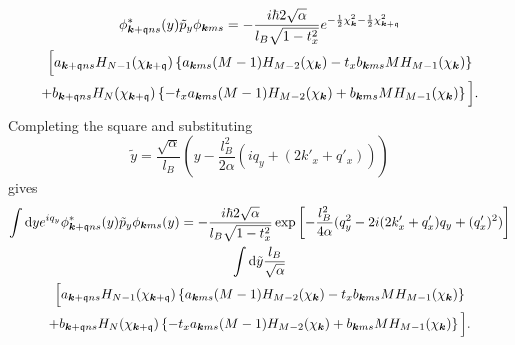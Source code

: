 \begin{multline}
  \phi ^{*} _{\bm{k} + \mathfrak{q} ns} (y) \tilde{p}_{y} \phi _{\bm{k} m s}
  = -\frac{i\hbar 2 \sqrt{\alpha } }{l_{B} \sqrt{1 - t_{x}^2} }
  e^{-\frac{1}{2} \chi _{\bm{k}}^2 - \frac{1}{2} \chi _{\bm{k} + \mathfrak{q}} ^2}\\
  \Big[
  a_{\bm{k} + \mathfrak{q} ns} H_{N-1}(\chi_{\bm{k}+\mathfrak{q}})
  \left\{a_{\bm{k} ms} (M-1) H_{M-2} (\chi_{\bm{k}}) - t_{x} b_{\bm{k} ms} M H_{M-1} (\chi_{\bm{k}})\right\}\\
  +
  b_{\bm{k} + \mathfrak{q} ns} H_{N} (\chi_{\bm{k} + \mathfrak{q}})
  \left\{-t_{x} a_{\bm{k} ms} (M-1) H_{M-2} (\chi_{\bm{k}}) + b_{\bm{k} ms} M H_{M-1} (\chi_{\bm{k}})\right\}
  \Big].
\end{multline}
Completing the square and substituting
\[
  \tilde{y} = \frac{\sqrt{ \alpha  }}{l_{B}}
  \left(y - \frac{l_{B}^2}{2 \alpha } (i q_{y} + (2 k'_x + q' _x) ) \right)
\]
gives
\begin{multline}
  \int \mathrm{d}y
  e^{i q_{y}}
  \phi ^{*}_{\bm{k} + \mathfrak{q} ns}(y) \tilde{p}_{y}
  \phi_{\bm{k} ms} (y)
  =
  - \frac{i\hbar 2 \sqrt{\alpha} }{l_{B} \sqrt{1 - t_{x}^2} }
  \exp
  \left[
    - \frac{l_{B}^2}{4 \alpha } (q_{y}^2 - 2 i (2k' _x + q' _x) q_{y} + (q' _x)^2 )
  \right  ]\\
  \int \mathrm{d} \tilde{y} \frac{l_{B}}{\sqrt{\alpha } }\\
  \Big[
  a_{\bm{k} + \mathfrak{q} ns} H_{N-1}( \chi _{\bm{k} + \mathfrak{q}} )
  \left\{
    a_{\bm{k} ms} (M-1) H_{M-2} ( \chi _{\bm{k}} )
    - t_{x} b_{\bm{k} ms} M H_{M-1} ( \chi _{\bm{k}} ) \right\}\\
  +
  b_{\bm{k} + \mathfrak{q} ns} H_{N} ( \chi _{\bm{k} + \mathfrak{q}} )
  \left\{
    -t_{x} a_{\bm{k} ms} (M-1) H_{M-2} ( \chi _{\bm{k}} )
    + b_{\bm{k} ms} M H_{M-1} ( \chi _{\bm{k}} )
  \right\}
  \Big].
\end{multline}

